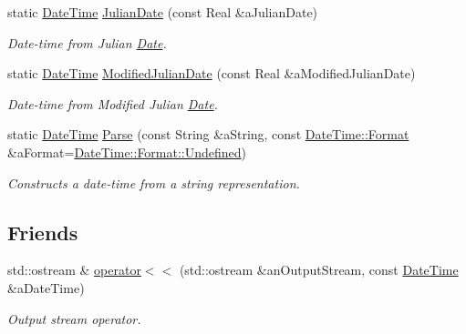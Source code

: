 \begin{DoxyCompactItemize}
static \hyperlink{classostk_1_1physics_1_1time_1_1_date_time}{Date\+Time} \hyperlink{classostk_1_1physics_1_1time_1_1_date_time_a12ae2e3669cf32a915079228979d67ae}{Julian\+Date} (const Real \&a\+Julian\+Date)
\begin{DoxyCompactList}\small\item\em Date-\/time from Julian \hyperlink{classostk_1_1physics_1_1time_1_1_date}{Date}. \end{DoxyCompactList}\item 
static \hyperlink{classostk_1_1physics_1_1time_1_1_date_time}{Date\+Time} \hyperlink{classostk_1_1physics_1_1time_1_1_date_time_a9584452e9ad5f915c5a540a070910556}{Modified\+Julian\+Date} (const Real \&a\+Modified\+Julian\+Date)
\begin{DoxyCompactList}\small\item\em Date-\/time from Modified Julian \hyperlink{classostk_1_1physics_1_1time_1_1_date}{Date}. \end{DoxyCompactList}\item 
static \hyperlink{classostk_1_1physics_1_1time_1_1_date_time}{Date\+Time} \hyperlink{classostk_1_1physics_1_1time_1_1_date_time_a63137170ace92a8525af219e03cba573}{Parse} (const String \&a\+String, const \hyperlink{classostk_1_1physics_1_1time_1_1_date_time_a1d21d982b18bf56ed684fcf1cd97e092}{Date\+Time\+::\+Format} \&a\+Format=\hyperlink{classostk_1_1physics_1_1time_1_1_date_time_a1d21d982b18bf56ed684fcf1cd97e092aec0fc0100c4fc1ce4eea230c3dc10360}{Date\+Time\+::\+Format\+::\+Undefined})
\begin{DoxyCompactList}\small\item\em Constructs a date-\/time from a string representation. \end{DoxyCompactList}\end{DoxyCompactItemize}
\subsection*{Friends}
\begin{DoxyCompactItemize}
\item 
std\+::ostream \& \hyperlink{classostk_1_1physics_1_1time_1_1_date_time_afd7a10118810d4133db2044ddbb7e001}{operator$<$$<$} (std\+::ostream \&an\+Output\+Stream, const \hyperlink{classostk_1_1physics_1_1time_1_1_date_time}{Date\+Time} \&a\+Date\+Time)
\begin{DoxyCompactList}\small\item\em Output stream operator. \end{DoxyCompactList}\end{DoxyCompactItemize}


